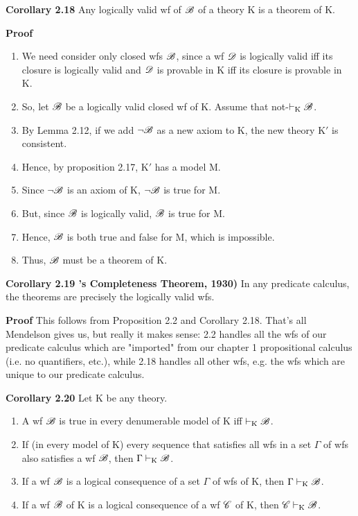\textbf{Corollary 2.18}
Any logically valid wf of $\mathscr{B}$ of a theory K is a theorem of K.

\textbf{Proof}
\begin{enumerate}
    \item We need consider only closed wfs $\mathscr{B}$, since a wf $\mathscr{D}$ is logically valid iff its closure is logically valid and $\mathscr{D}$ is provable in K iff its closure is provable in K.
    \item So, let $\mathscr{B}$ be a logically valid closed wf of K. Assume that not-$\vdash_\text{K} \mathscr{B}$.
    \item By Lemma 2.12, if we add $\lnot \mathscr{B}$ as a new axiom to K, the new theory K$'$ is consistent.
    \item Hence, by proposition 2.17, K$'$ has a model M.
    \item Since $\lnot \mathscr{B}$ is an axiom of K, $\lnot \mathscr{B}$ is true for M.
    \item But, since $\mathscr{B}$ is logically valid, $\mathscr{B}$ is true for M.
    \item Hence, $\mathscr{B}$ is both true and false for M, which is impossible.
    \item Thus, $\mathscr{B}$ must be a theorem of K.
\end{enumerate} 

\textbf{Corollary 2.19 \godel's Completeness Theorem, 1930)}
In any predicate calculus, the theorems are precisely the logically valid wfs. 

\textbf{Proof}
This follows from Proposition 2.2 and Corollary 2.18. That's all Mendelson gives us, but really it makes sense: 2.2 handles all the wfs of our predicate calculus which are "imported" from our chapter 1 propositional calculus (i.e. no quantifiers, etc.), while 2.18 handles all other wfs, e.g. the wfs which are unique to our predicate calculus.

\textbf{Corollary 2.20}
Let K be any theory.
\begin{enumerate}
    \item A wf $\mathscr{B}$ is true in every denumerable model of K iff $\vdash_\text{K} \mathscr{B}$.
    \item If (in every model of K) every sequence that satisfies all wfs in a set $\Gamma$ of wfs also satisfies a wf $\mathscr{B}$, then $\Gamma \vdash_\text{K} \mathscr{B}$.
    \item If a wf $\mathscr{B}$ is a logical consequence of a set $\Gamma$ of wfs of K, then $\Gamma \vdash_\text{K} \mathscr{B}$.
    \item If a wf $\mathscr{B}$ of K is a logical consequence of a wf $\mathscr{C}$ of K, then $\mathscr{C} \vdash_\text{K} \mathscr{B}$.
\end{enumerate}

